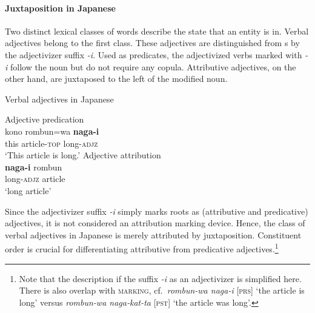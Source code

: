 \paragraph*{Juxtaposition in Japanese}
Two distinct lexical classes of words describe the state that an entity is in. Verbal adjectives belong to the first class. These adjectives are distinguished from s by the adjectivizer suffix \textit{-i}. Used as predicates, the adjectivized verbs marked with \textit{-i} follow the noun but do not require any copula. Attributive adjectives, on the other hand, are juxtaposed to the left of the modified noun. 
\begin{exe}
\ex \rm{Verbal adjectives in Japanese \citep[170]{backhouse1984}}
\begin{xlist}
\ex \rm{Adjective predication}\\
\gll	kono rombun=wa \textbf{naga-i}\\
	this article-\textsc{top} long-\textsc{adjz}\\
\glt	‘This article is long.’
\ex \rm{Adjective attribution}\\
\gll	\textbf{naga-i} rombun\\
	long-\textsc{adjz} article\\
\glt	‘long article’
\end{xlist}
\end{exe}
Since the adjectivizer suffix \textit{-i} simply marks  roots as (attributive and predicative) adjectives, it is not considered an attribution marking device. Hence, the class of verbal adjectives in Japanese is merely attributed by juxtaposition. Constituent order is crucial for differentiating attributive from predicative adjectives.\footnote{Note that the description if the suffix \textit{-i} as an adjectivizer is simplified here. There is also overlap with \textsc{ marking}, cf.~\textit{rombun-wa naga-i} [\textsc{prs}] ‘the article is long’ versus \textit{rombun-wa naga‑kat-ta} [\textsc{pst}] ‘the article was long’.}

